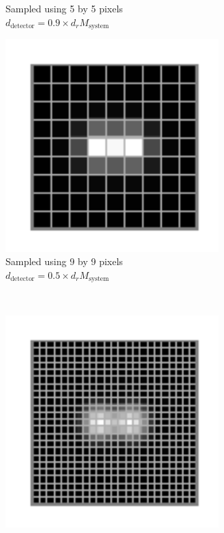 \begin{figure}
\begin{subfigure}[b]{0.4\textwidth}
        \caption{Sampled using 5 by 5 pixels\\$d_{\text{detector}} = 0.9 \times  d_{r}M_{\text{system}}$}
        \label{fig:digital_airy_sample_5}
    \end{subfigure}
    \begin{subfigure}[b]{0.4\textwidth}
        \centering
        \includegraphics[width=0.9\textwidth]{./sampling/digital_airy_sample_9}
        \caption{Sampled using 9 by 9 pixels\\$d_{\text{detector}} = 0.5 \times d_{r}M_{\text{system}}$}
        \label{fig:digital_airy_sample_9}
    \end{subfigure}~
    \begin{subfigure}[b]{0.4\textwidth}
        \centering
        \includegraphics[width=0.9\textwidth]{./sampling/digital_airy_sample_23}

\end{subfigure}
\end{figure}
